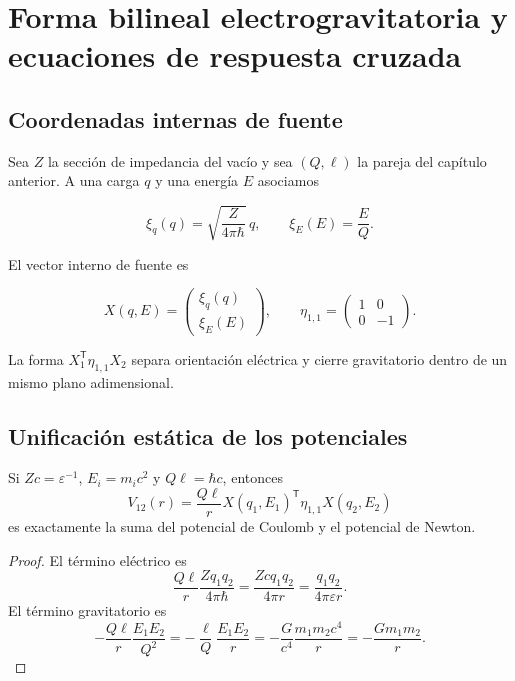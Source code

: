 \chapter{Forma bilineal electrogravitatoria y ecuaciones de respuesta cruzada}
\label{chap:forma-electrogravitatoria}

\section{Coordenadas internas de fuente}

Sea \(Z\) la secci\'on de impedancia del vac\'io y sea \((Q,\ell)\) la pareja
del cap\'itulo anterior. A una carga \(q\) y una energ\'ia \(E\) asociamos

\[
\xi_q(q)=\sqrt{\frac{Z}{4\pi\hbar}}\,q,
\qquad
\xi_E(E)=\frac{E}{Q}.
\]

El vector interno de fuente es

\[
X(q,E)=
\begin{pmatrix}\xi_q(q)\\ \xi_E(E)\end{pmatrix},
\qquad
\eta_{1,1}=
\begin{pmatrix}1&0\\0&-1\end{pmatrix}.
\]

La forma \(X_1^{\mathsf T}\eta_{1,1}X_2\) separa orientaci\'on el\'ectrica y
cierre gravitatorio dentro de un mismo plano adimensional.

\section{Unificaci\'on est\'atica de los potenciales}

\begin{theorem}
\label{thm:rm-emg-potential}
Si \(Zc=\varepsilon^{-1}\), \(E_i=m_ic^2\) y
\(Q\ell=\hbar c\), entonces
\begin{equation}
\boxed{
V_{12}(r)=\frac{Q\ell}{r}
X(q_1,E_1)^{\mathsf T}\eta_{1,1}X(q_2,E_2)}
\label{eq:rm-emg-potential}
\end{equation}
es exactamente la suma del potencial de Coulomb y el potencial de Newton.
\end{theorem}

\begin{proof}
El t\'ermino el\'ectrico es
\[
\frac{Q\ell}{r}\frac{Zq_1q_2}{4\pi\hbar}
=\frac{Zcq_1q_2}{4\pi r}
=\frac{q_1q_2}{4\pi\varepsilon r}.
\]
El t\'ermino gravitatorio es
\[
-\frac{Q\ell}{r}\frac{E_1E_2}{Q^2}
=-\frac{\ell}{Q}\frac{E_1E_2}{r}
=-\frac{G}{c^4}\frac{m_1m_2c^4}{r}
=-\frac{Gm_1m_2}{r}.
\]
\end{proof}

